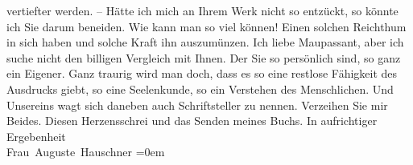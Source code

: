 \begin{ledgroupsized}[t]{13cm}
               vertiefter werden. –\pend
           \pstart
           Hätte ich mich an Ihrem Werk
               nicht so entzückt, so könnte ich Sie darum beneiden. Wie kann man so viel können!
               Einen solchen Reichthum in sich haben und solche Kraft ihn auszumünzen. Ich liebe Maupassant, aber ich suche nicht den billigen
               Vergleich mit Ihnen. Der Sie so persönlich sind, so ganz ein Eigener. {\pb}Ganz traurig wird man doch, dass es so eine restlose
               Fähigkeit des Ausdrucks giebt, so eine Seelenkunde, so ein Verstehen des
               Menschlichen. Und Unsereins wagt sich daneben auch Schriftsteller zu nennen.
               Verzeihen Sie mir Beides. Diesen Herzensschrei und das Senden meines Buchs.\pend
           \pstart
           In aufrichtiger Ergebenheit{\\[\baselineskip]}\spacefill\mbox{Frau Auguste Hauschner}\pend
           \leftskip=0em{}\endnumbering{}\end{ledgroupsized}  \newcommand{\dateiname}{L02586}\newcommand{\titel}{Auguste Hauschner an Arthur Schnitzler, 17. 6. 1908}\newcommand{\editorInnen}{Martin Anton Müller und Laura Untner}
      